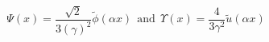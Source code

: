 \begin{equation}
\Psi(x)=\frac{\sqrt{2}}{3(\gamma)^2}\tilde{\phi}(\alpha
x)~~\text{and}~~ \Upsilon(x)=\frac4{3\gamma^2}\tilde{u}(\alpha x)
\label{psi-up-m}
\end{equation}

